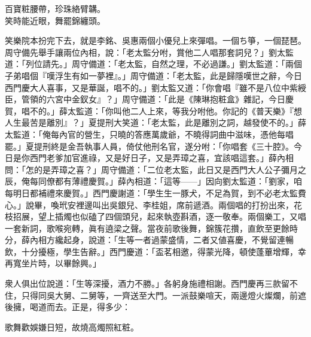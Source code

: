 \begin{myquote}
百寶粧腰帶，珍珠絡臂韝。\\笑時能近眼，舞罷錦纏頭。
\end{myquote}

笑樂院本扮完下去，就是李銘、吳惠兩個小優兒上來彈唱。一個ち箏，一個琵琶。周守備先舉手讓兩位內相，說：「老太監分咐，賞他二人唱那套詞兒？」劉太監道：「列位請先。」周守備道：「老太監，自然之理，不必過謙。」劉太監道：「兩個子弟唱個『嘆浮生有如一夢裡』。」{}周守備道：「老太監，此是歸隱嘆世之辭，今日西門慶大人喜事，又是華誕，唱不的。」劉太監又道：「你會唱『雖不是八位中紫綬臣，管領的六宮中金釵女』？」{}周守備道：「此是《陳琳抱粧盒》雜記，今日慶賀，唱不的。」薛太監道：「你叫他二人上來，等我分咐他。你記的《普天樂》『想人生最苦是離別』？」{}夏提刑大笑道：「老太監，此是離別之詞，越發使不的。」薛太監道：「俺每內官的營生，只曉的答應萬歲爺，不曉得詞曲中滋味，憑他每唱罷。」{}夏提刑終是金吾執事人員，倚仗他刑名官，遂分咐：「你唱套《三十腔》。今日是你西門老爹加官進祿，又是好日子，又是弄璋之喜，宜該唱這套。」薛內相問：「怎的是弄璋之喜？」{}周守備道：「二位老太監，此日又是西門大人公子彌月之辰，俺每同僚都有薄禮慶賀。」薛內相道：「這等——」因向劉太監道：「劉家，咱每明日都補禮來慶賀。」西門慶謝道：「學生生一豚犬，不足為賀，到不必老太監費心。」說畢，喚玳安裡邊叫出吳銀兒、李桂姐，席前遞酒。兩個唱的打扮出來，花枝招展，望上插燭也似磕了四個頭兒，起來執壺斟酒，逐一敬奉。兩個樂工，又唱一套新詞，歌喉宛轉，眞有遶梁之聲。當夜前歌後舞，錦簇花攢，直飲至更餘時分，薛內相方纔起身，說道：「生等一者過蒙盛情，二者又値喜慶，不覺留連暢飲，十分擾極，學生告辭。」西門慶道：「盃茗相邀，得蒙光降，頓使蓬蓽增輝，幸再寬坐片時，以畢餘興。」

衆人俱出位說道：「生等深擾，酒力不勝。」各躬身施禮相謝。西門慶再三款留不住，只得同吳大舅、二舅等，一齊送至大門。一派鼓樂喧天，兩邊燈火燦爛，前遮後擁，喝道而去。正是，得多少：

\begin{myquote}
歌舞歡娛嫌日短，故燒高燭照紅粧。
\end{myquote}

